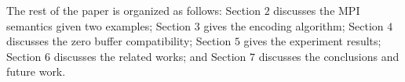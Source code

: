 The rest of the paper is organized as follows: Section $2$ discusses the MPI semantics given two examples; Section $3$ gives the encoding algorithm; Section $4$ discusses the zero buffer compatibility; Section $5$ gives the experiment results; Section $6$ discusses the related works; and Section $7$ discusses the conclusions and future work.

\examplefigone


           